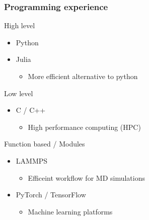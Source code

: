\documentclass[
	10pt, %
]{beamer}
\begin{document}
\begin{frame}
	\frametitle{Programming experience}
	{\large High level}
	\begin{itemize}
		\item Python
		\item Julia
		\begin{itemize}
			\item More efficient alternative to python
		\end{itemize}
	\end{itemize} 
	\vspace{0.2cm}
	
	{\large Low level}
	\begin{itemize}
		\item C / C++
		\begin{itemize}
			\item High performance computing (HPC)
		\end{itemize}
	\end{itemize}
	\vspace{0.2cm}

	{\large Function based / Modules}
	\begin{itemize}
		\item LAMMPS
		\begin{itemize}
			\item Efficeint workflow for MD simulations
		\end{itemize}
		\item PyTorch / TensorFlow
		\begin{itemize}
			\item Machine learning platforms
		\end{itemize}
	\end{itemize}

\end{frame}



\end{document}
